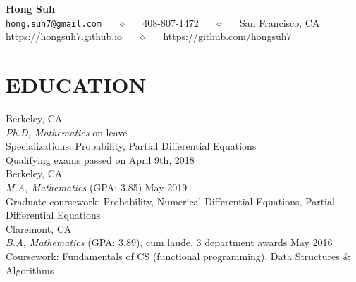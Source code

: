 \documentclass{simplecv}
\begin{document}
\thispagestyle{empty}
\begin{center}
  {\Large\bf Hong Suh} \\
  \texttt{hong.suh7@gmail.com} ~~ $\diamond$ ~~ 408-807-1472 ~~ $\diamond$ ~~ San Francisco, CA \\
  \url{https://hongsuh7.github.io} ~~ $\diamond$ ~~ \url{https://github.com/hongsuh7} \\
\end{center}
\vspace{-0.5cm}

\section{EDUCATION} 

\hfill Berkeley, CA\\
{\it Ph.D, Mathematics} \hfill on leave \\
Specializations: Probability, Partial Differential Equations \hfill\\
Qualifying exams passed on April 9th, 2018 \\


\hfill Berkeley, CA\\
{\it M.A, Mathematics} (GPA: 3.85) \hfill May 2019  \\
Graduate coursework: Probability, Numerical Differential Equations, Partial Differential Equations\\


 \hfill Claremont, CA\\
{\sl B.A, Mathematics} (GPA: 3.89), cum laude, 3 department awards \hfill May 2016   \\
Coursework: Fundamentals of CS (functional programming), Data Structures \& Algorithms\\


\vspace{-0.6cm} 

\end{document}
